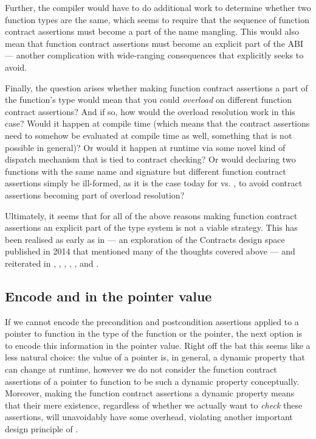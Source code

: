 Further, the compiler would have to do additional work to determine whether two function types are the same, which seems to require that the sequence of function contract assertions must become a part of the name mangling. This would also mean that function contract assertions must become an explicit part of the ABI --- another complication with wide-ranging consequences that \cite{P2900R7} explicitly seeks to avoid.

Finally, the question arises whether making function contract assertions a part of the function's type would mean that you could \emph{overload} on different function contract assertions? And if so, how would the overload resolution work in this case? Would it happen at compile time (which means that the contract assertions need to somehow be evaluated at compile time as well, something that is not possible in general)? Or would it happen at runtime via some novel kind of dispatch mechanism that is tied to contract checking? Or would declaring two functions with the same name and signature but different function contract assertions simply be ill-formed, as it is the case today for  vs. , to avoid contract assertions becoming part of overload resolution?

Ultimately, it seems that for all of the above reasons making function contract assertions an explicit part of the type system is not a viable strategy. This has been realised as early as in \cite{N4110} --- an exploration of the Contracts design space published in 2014 that mentioned many of the thoughts covered above --- and reiterated in \cite{N4415}, \cite{P0246R0}, \cite{P0247R0}, \cite{P0287R0}, \cite{P0380R1}, and \cite{P0542R5}.

\subsection{Encode  and  in the pointer value}

If we cannot encode the precondition and postcondition assertions applied to a pointer to function in the type of the function or the pointer, the next option is to encode this information in the pointer value. Right off the bat this seems like a less natural choice: the value of a pointer is, in general, a dynamic property that can change at runtime, however we do not consider the function contract assertions of a pointer to function to be such a dynamic property conceptually. Moreover, making the function contract assertions a dynamic property means that their mere existence, regardless of whether we actually want to \emph{check} these assertions, will unavoidably have some overhead, violating another important design principle of \cite{P2900R7}.

